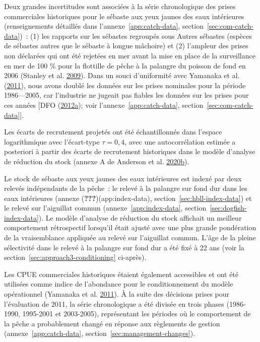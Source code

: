 \documentclass[11pt]{book}
\begin{document}
Deux grandes incertitudes sont associées à la série chronologique des prises commerciales historiques pour le sébaste aux yeux jaunes des eaux intérieures (renseignements détaillés dans l'annexe~\ref{app:catch-data}, section~\ref{sec:com-catch-data})~: (1) les rapports sur les sébastes regroupés sous Autres sébastes (espèces de sébastes autres que le sébaste à longue mâchoire) et (2) l'ampleur des prises non déclarées qui ont été rejetées en mer avant la mise en place de la surveillance en mer de 100 \% pour la flottille de pêche à la palangre du poisson de fond en 2006 (Stanley et al. \protect\hyperlink{ref-stanley2009}{2009}). Dans un souci d'uniformité avec Yamanaka et al. (\protect\hyperlink{ref-yamanaka2011}{2011}), nous avons doublé les données sur les prises nominales pour la période 1986---2005, car l'industrie ne jugeait pas fiables les données sur les prises pour ces années {[}DFO (\protect\hyperlink{ref-dfo2012}{2012}\protect\hyperlink{ref-dfo2012}{a}); voir l'annexe~\ref{app:catch-data}, section~\ref{sec:com-catch-data}{]}.

Les écarts de recrutement projetés ont été échantillonnés dans l'espace logarithmique avec l'écart-type \(\tau = 0,4\), avec une autocorrélation estimée a posteriori à partir des écarts de recrutement historiques dans le modèle d'analyse de réduction du stock (annexe A de Anderson et al. \protect\hyperlink{ref-anderson2020gfmp}{2020}\protect\hyperlink{ref-anderson2020gfmp}{b}).

Le stock de sébaste aux yeux jaunes des eaux intérieures est indexé par deux relevés indépendants de la pêche~: le relevé à la palangre sur fond dur dans les eaux intérieures (annexe ({\textbf{???}})(app:index-data), section~\ref{sec:hbll-index-data}) et le relevé sur l'aiguillat commun (annexe~\ref{app:index-data}, section~\ref{sec:dogfish-index-data}). Le modèle d'analyse de réduction du stock affichait un meilleur comportement rétrospectif lorsqu'il était ajusté avec une plus grande pondération de la vraisemblance appliquée au relevé sur l'aiguillat commun. L'âge de la pleine sélectivité dans le relevé à la palangre sur fond dur a été fixé à 22 ans (voir la section~\ref{sec:approach3-conditioning} ci-après).

Les CPUE commerciales historiques étaient également accessibles et ont été utilisées comme indice de l'abondance pour le conditionnement du modèle opérationnel (Yamanaka et al. \protect\hyperlink{ref-yamanaka2011}{2011}). À la suite des décisions prises pour l'évaluation de 2011, la série chronologique a été divisée en trois phases (1986-1990, 1995-2001 et 2003-2005), représentant les périodes où le comportement de la pêche a probablement changé en réponse aux règlements de gestion (annexe~\ref{app:catch-data}, section~\ref{sec:management-changes}).
\end{document}
